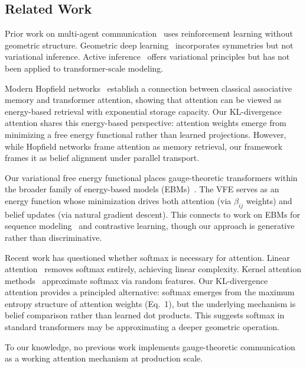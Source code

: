 \documentclass[twoside,11pt]{article}
\begin{document}
\subsection{Related Work}

Prior work on multi-agent communication~\citep{foerster2016learning,sukhbaatar2016learning} uses reinforcement learning without geometric structure. Geometric deep learning~\citep{bronstein2021geometric,fuchs2020se3} incorporates symmetries but not variational inference. Active inference~\citep{friston2010free,parr2022active} offers variational principles but has not been applied to transformer-scale modeling.

Modern Hopfield networks~\citep{ramsauer2020hopfield} establish a connection between classical associative memory and transformer attention, showing that attention can be viewed as energy-based retrieval with exponential storage capacity. Our KL-divergence attention shares this energy-based perspective: attention weights emerge from minimizing a free energy functional rather than learned projections. However, while Hopfield networks frame attention as memory retrieval, our framework frames it as belief alignment under parallel transport.

Our variational free energy functional places gauge-theoretic transformers within the broader family of energy-based models (EBMs)~\citep{lecun2006tutorial}. The VFE serves as an energy function whose minimization drives both attention (via $\beta_{ij}$ weights) and belief updates (via natural gradient descent). This connects to work on EBMs for sequence modeling~\citep{deng2020residual} and contrastive learning, though our approach is generative rather than discriminative.

Recent work has questioned whether softmax is necessary for attention. Linear attention~\citep{katharopoulos2020transformers} removes softmax entirely, achieving linear complexity. Kernel attention methods~\citep{choromanski2020rethinking} approximate softmax via random features. Our KL-divergence attention provides a principled alternative: softmax emerges from the maximum entropy structure of attention weights (Eq.~1), but the underlying mechanism is belief comparison rather than learned dot products. This suggests softmax in standard transformers may be approximating a deeper geometric operation.

To our knowledge, no previous work implements gauge-theoretic communication as a working attention mechanism at production scale.
\end{document}

